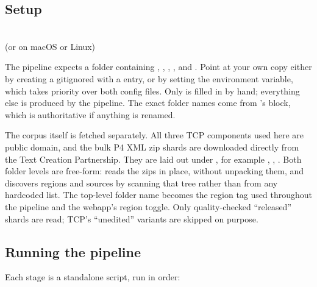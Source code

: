\documentclass[11pt]{article}
\begin{document}
\subsection{Setup}

\begin{dobox}
\\
\quad\textrm{(or  on macOS or Linux)}\\
\end{dobox}

The pipeline expects a  folder containing
, , , ,
and . Point at your own copy either by creating a
gitignored  with a  entry, or by
setting the  environment variable, which takes priority
over both config files. Only  is filled in by hand;
everything else is produced by the pipeline. The exact folder names come
from 's  block, which is authoritative if
anything is renamed.

The corpus itself is fetched separately. All three TCP components used
here are public domain, and the bulk P4 XML zip shards are downloaded
directly from the Text Creation Partnership. They are laid out under
, for example
, ,
. Both folder levels are free-form:
 reads the zips in place, without unpacking them, and
discovers regions and sources by scanning that tree rather than from any
hardcoded list. The top-level folder name becomes the region tag used
throughout the pipeline and the webapp's region toggle. Only
quality-checked ``released'' shards are read; TCP's ``unedited'' variants
are skipped on purpose.

\subsection{Running the pipeline}

Each stage is a standalone script, run in order:

\begin{dobox}
\\
\\
\\
\\
\\
\end{dobox}
\end{document}

